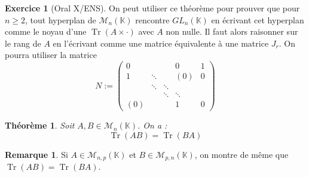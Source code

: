 \documentclass[french]{book}
\newcommand{\K}{\mathbb{K}}
\theoremstyle{plain}
\newtheorem{thm}{Théorème}[chapter]
\theoremstyle{definition}
\newtheorem{rmq}{Remarque}[chapter]
\newtheorem{exe}{Exercice}[chapter]
\theoremstyle{remark}
\DeclareMathOperator{\tr}{Tr}
\begin{document}
\begin{exe}[Oral X/ENS]
	On peut utiliser ce théorème pour prouver que pour $n\geqslant2$, tout hyperplan de $\mathcal{M}_n(\K)$ rencontre $GL_n(\K)$ en écrivant cet hyperplan comme le noyau d'une $\tr(A\times\cdot)$ avec $A$ non nulle. Il faut alors raisonner sur le rang de $A$ en l'écrivant comme une matrice équivalente à une matrice $J_r$. On pourra utiliser la matrice $$N:=\begin{pmatrix}0&&&0&1\\1&\ddots&&(0)&0\\&\ddots&\ddots&&\\&&\ddots&\ddots&\\ (0)&&&1&0\end{pmatrix}$$
\end{exe}
\begin{thm}
	Soit $A,B\in\mathcal{M}_n(\K)$. On a : $$\tr(AB)=\tr(BA)$$
\end{thm}
\begin{rmq}
	Si $A\in\mathcal{M}_{n,p}(\K)$ et $B\in\mathcal{M}_{p,n}(\K)$, on montre de même que $\tr(AB)=\tr(BA)$.
\end{rmq}
\end{document}
